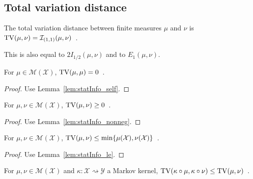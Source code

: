 \subsection{Total variation distance}

\begin{definition}
  \label{def:TV}
  The total variation distance between finite measures $\mu$ and $\nu$ is $\operatorname{TV}(\mu, \nu) = \mathcal I_{(1,1)}(\mu, \nu)$~.
\end{definition}

This is also equal to $2 I_{1/2}(\mu, \nu)$ and to $E_1(\mu, \nu)$.

\begin{lemma}
  \label{lem:tv_self}
  For $\mu \in \mathcal M(\mathcal X)$, $\operatorname{TV}(\mu, \mu) = 0$~.
\end{lemma}

\begin{proof}%
{}
Use Lemma~\ref{lem:statInfo_self}.
\end{proof}

\begin{lemma}
  \label{lem:tv_nonneg}
  For $\mu, \nu \in \mathcal M(\mathcal X)$, $\operatorname{TV}(\mu, \nu) \ge 0$~.
\end{lemma}

\begin{proof}%
{}
Use Lemma~\ref{lem:statInfo_nonneg}.
\end{proof}


\begin{lemma}
  \label{lem:tv_le}
  For $\mu, \nu \in \mathcal M(\mathcal X)$, $\operatorname{TV}(\mu, \nu) \le \min\{\mu(\mathcal X), \nu(\mathcal X)\}$~.
\end{lemma}

\begin{proof}%
{}
Use Lemma~\ref{lem:statInfo_le}.
\end{proof}


\begin{theorem}
  \label{thm:tv_data_proc}
  For $\mu, \nu \in \mathcal M(\mathcal X)$ and $\kappa : \mathcal X \rightsquigarrow \mathcal Y$ a Markov kernel, $\operatorname{TV}(\kappa \circ \mu, \kappa \circ \nu) \le \operatorname{TV}(\mu, \nu)$~.
\end{theorem}

